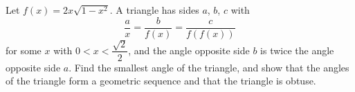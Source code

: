 Let $f(x)=2x\sqrt{1-x^2}$. A triangle has sides $a$, $b$, $c$ with
\[\dfrac ax=\dfrac b{f(x)}=\dfrac c{f(f(x))}\]
for some $x$ with $0<x<\dfrac{\sqrt2}{2}$, and the angle opposite side $b$ is twice the angle opposite side $a$. Find the smallest angle of the triangle, and show that the angles of the triangle form a geometric sequence and that the triangle is obtuse.
